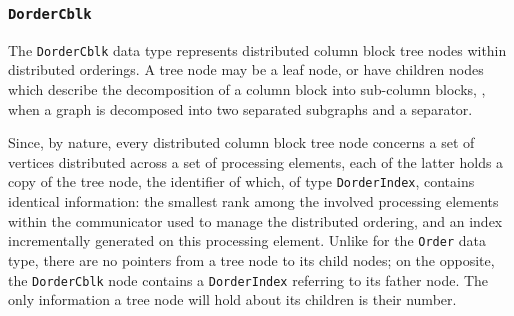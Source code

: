 \subsubsection{\texttt{DorderCblk}}
\label{sec-data-dorder-cblk}

The \texttt{DorderCblk} data type represents distributed column block
tree nodes within distributed orderings. A tree node may be a leaf
node, or have children nodes which describe the decomposition of a
column block into sub-column blocks, \eg, when a graph is decomposed
into two separated subgraphs and a separator.

Since, by nature, every distributed column block tree node concerns a
set of vertices distributed across a set of processing elements, each
of the latter holds a copy of the tree node, the identifier of which,
of type \texttt{Dorder\lbt Index}, contains identical information: the
smallest rank among the involved processing elements within the
communicator used to manage the distributed ordering, and an index
incrementally generated on this processing element. Unlike for the
\texttt{Order} data type, there are no pointers from a tree node to
its child nodes; on the opposite, the \texttt{Dorder\lbt Cblk} node
contains a \texttt{Dorder\lbt Index} referring to its father node. The
only information a tree node will hold about its children is their
number.

